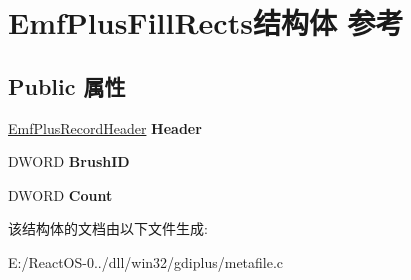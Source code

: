 \hypertarget{struct_emf_plus_fill_rects}{}\section{Emf\+Plus\+Fill\+Rects结构体 参考}
\label{struct_emf_plus_fill_rects}
\subsection*{Public 属性}
\begin{DoxyCompactItemize}
\item 
\mbox{\label{struct_emf_plus_fill_rects_a55f2f57fcb6047a0883146d6bab09122}} 
\hyperlink{struct_emf_plus_record_header}{Emf\+Plus\+Record\+Header} {\bfseries Header}
\item 
\mbox{\label{struct_emf_plus_fill_rects_afc468e353a7804e1f1ffd011cdf8b553}} 
D\+W\+O\+RD {\bfseries Brush\+ID}
\item 
\mbox{\label{struct_emf_plus_fill_rects_aee2a19f043b7c5c4eb25bde9f47f26bd}} 
D\+W\+O\+RD {\bfseries Count}
\end{DoxyCompactItemize}


该结构体的文档由以下文件生成\+:\begin{DoxyCompactItemize}
\item 
E\+:/\+React\+O\+S-\/0../dll/win32/gdiplus/metafile.\+c\end{DoxyCompactItemize}

